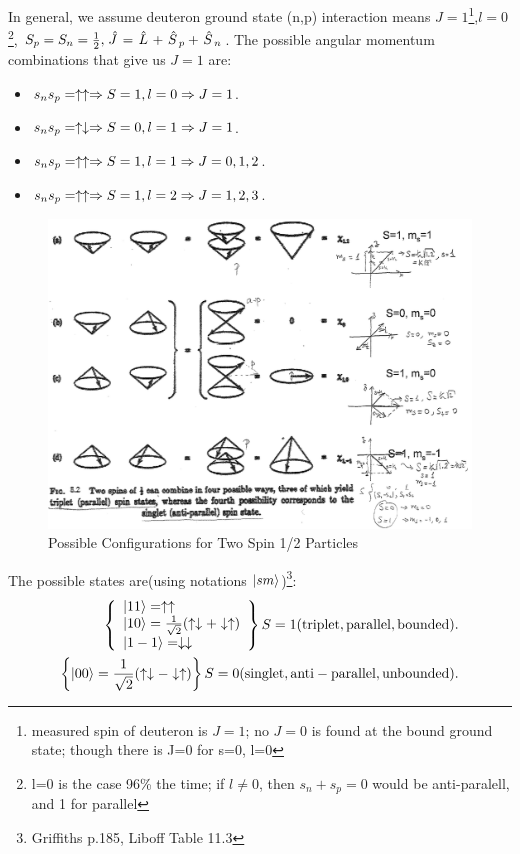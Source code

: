 \documentclass{school-22.101-notes}
\begin{document}
In general, we assume deuteron ground state (n,p) interaction means $J=1$\footnote{measured spin of deuteron is $J=1$; no $J=0$ is found at the bound ground state; though there is J=0 for s=0, l=0},$l=0$\footnote{l=0 is the case 96\% the time; if $l\neq 0$, then $s_n+s_p =0$ would be anti-paralell, and 1 for parallel}, $S_p = S_n = \frac{1}{2}, \left. \hat{J} \right. = \left. \hat{L} \right. + \left. \hat{S} \right._p + \left. \hat{S} \right._n$. The possible angular momentum combinations that give us $J=1$ are: 
\begin{itemize}
\item $s_n s_p = \uparrow \uparrow \Rightarrow S=1, l=0 \Rightarrow J=1 $.
\item $s_n s_p = \uparrow \downarrow \Rightarrow S = 0, l=1 \Rightarrow J=1$. 
\item $s_n s_p = \uparrow \uparrow \Rightarrow S=1, l=1 \Rightarrow J=0,1,2$. 
\item $s_n s_p = \uparrow \uparrow \Rightarrow S=1, l=2 \Rightarrow J = 1,2,3$.
\end{itemize}

\begin{figure}[h!]
    \centering
    \includegraphics[width=5in]{images/deuteron/deuteron-possible-config.png}
    \caption{Possible Configurations for Two Spin 1/2 Particles}
\end{figure}

The possible states are(using notations $\left| s m \right>$)\footnote{Griffiths p.185, Liboff Table 11.3}: 
\begin{align}
\left\{ \begin{array}{l} 
\left| 1 1 \right> = \uparrow \uparrow \\
\left| 1 0 \right> = \frac{1}{\sqrt{2}} (\uparrow \downarrow + \downarrow \uparrow ) \\
\left| 1 -1 \right> = \downarrow \downarrow
\end{array} \right\}
S = 1 (\mathrm{triplet, parallel, bounded}). \\
\left\{ \left| 0 0 \right> = \frac{1}{\sqrt{2}} (\uparrow \downarrow - \downarrow \uparrow ) \right\} 
S = 0 (\mathrm{singlet, anti-parallel, unbounded}).
\end{align}
\end{document}
